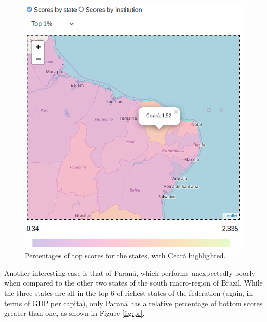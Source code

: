 \documentclass{vgtc}                          %
\begin{document}
\begin{figure}
	\centering
	\includegraphics[width=\columnwidth]{figures/ce.png}
	\caption{Percentages of top scores for the states, with Ceará highlighted.}
	\label{fig:ce}
\end{figure}

Another interesting case is that of Paraná, which performs unexpectedly poorly when compared to the other two states of the south macro-region of Brazil. While the three states are all in the top 6 of richest states of the federation (again, in terms of GDP per capita), only Paraná has a relative percentage of bottom scores greater than one, as shown in Figure \ref{fig:pr}.
\end{document}
